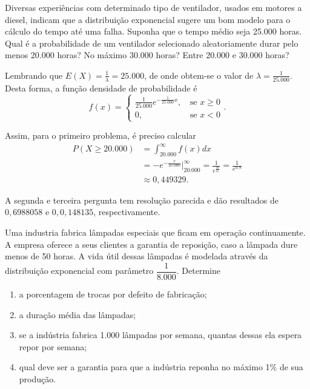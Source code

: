 \begin{example}
	Diversas experiências com determinado tipo de ventilador, usados em motores a diesel, indicam que a distribuição exponencial sugere um bom modelo para o cálculo do tempo até uma falha. Suponha que o tempo médio seja 25.000 horas. Qual é a probabilidade de um ventilador selecionado aleatoriamente durar pelo menos 20.000 horas? No máximo 30.000 horas? Entre 20.000 e 30.000 horas?
	
	Lembrando que $E(X)=\frac{1}{\lambda}=25.000$, de onde obtem-se o valor de $\lambda=\frac{1}{25.000}$. Desta forma, a função densidade de probabilidade é
	\[
		f(x)=\begin{cases}
			\frac{1}{25.000}e^{-\frac{1}{25.000}x}\text{,}&\text{ se }x\geqslant 0\\
			0\text{,}&\text{ se }x<0
		\end{cases}
		\text{.}
	\]
	
	Assim, para o primeiro problema, é preciso calcular
	\begin{align*}
		P(X\geqslant 20.000)&=\int_{20.000}^{\infty} f(x) dx\\
							&=-e^{-\frac{x}{25.000}}\Big|_{20.000}^{\infty} = \frac{1}{e^{\frac{20}{25}}} = \frac{1}{e^{0,8}}\\
							&\approx 0,449329\text{.}
	\end{align*}
	
	A segunda e terceira pergunta tem resolução parecida e dão resultados de $0,6988058$ e $0,0,148135$, respectivamente.
\end{example}

\begin{pageWidthArea}
	\begin{exerciseArea}
		\item Uma industria fabrica lâmpadas especiais que ficam em operação continuamente. A empresa oferece a seus clientes a garantia de reposição, caso a lâmpada dure menos de 50 horas. A vida útil dessas lâmpadas é modelada através da distribuição exponencial com parâmetro $\dfrac{1}{8.000}$. Determine
	
		\begin{enumerate}[label=(\alph*)]
			\item a porcentagem de trocas por defeito de fabricação;
			\item a duração média das lâmpadas;
			\item se a indústria fabrica 1.000 lâmpadas por semana, quantas dessas ela espera repor por semana;
			\item qual deve ser a garantia para que a indústria reponha no máximo 1\% de sua produção.
		\end{enumerate}
	\end{exerciseArea}
\end{pageWidthArea}

